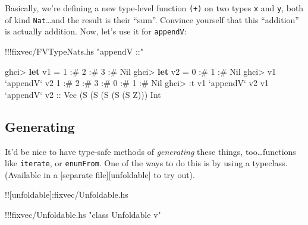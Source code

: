 \documentclass[]{article}
\newenvironment{Shaded}{}{}
\newcommand{\KeywordTok}[1]{\textcolor[rgb]{0.00,0.44,0.13}{\textbf{{#1}}}}
\newcommand{\DataTypeTok}[1]{\textcolor[rgb]{0.56,0.13,0.00}{{#1}}}
\newcommand{\DecValTok}[1]{\textcolor[rgb]{0.25,0.63,0.44}{{#1}}}
\newcommand{\StringTok}[1]{\textcolor[rgb]{0.25,0.44,0.63}{{#1}}}
\newcommand{\OtherTok}[1]{\textcolor[rgb]{0.00,0.44,0.13}{{#1}}}
\newcommand{\FunctionTok}[1]{\textcolor[rgb]{0.02,0.16,0.49}{{#1}}}
\newcommand{\NormalTok}[1]{{#1}}
\begin{document}
Basically, we're defining a new type-level function \texttt{(+)} on two
types \texttt{x} and \texttt{y}, both of kind \texttt{Nat}\ldots{}and
the result is their ``sum''. Convince yourself that this ``addition'' is
actually addition. Now, let's use it for \texttt{appendV}:

\begin{Shaded}
\begin{Highlighting}[]
\FunctionTok{!!!}\NormalTok{fixvec}\FunctionTok{/}\NormalTok{FVTypeNats.hs }\StringTok{"appendV ::"}
\end{Highlighting}
\end{Shaded}

\begin{Shaded}
\begin{Highlighting}[]
\NormalTok{ghci}\FunctionTok{>} \KeywordTok{let} \NormalTok{v1 }\FunctionTok{=} \DecValTok{1} \FunctionTok{:#} \DecValTok{2} \FunctionTok{:#} \DecValTok{3} \FunctionTok{:#} \DataTypeTok{Nil}
\NormalTok{ghci}\FunctionTok{>} \KeywordTok{let} \NormalTok{v2 }\FunctionTok{=} \DecValTok{0} \FunctionTok{:#} \DecValTok{1} \FunctionTok{:#} \DataTypeTok{Nil}
\NormalTok{ghci}\FunctionTok{>} \NormalTok{v1 }\OtherTok{`appendV`} \NormalTok{v2}
\DecValTok{1} \FunctionTok{:#} \DecValTok{2} \FunctionTok{:#} \DecValTok{3} \FunctionTok{:#} \DecValTok{0} \FunctionTok{:#} \DecValTok{1} \FunctionTok{:#} \DataTypeTok{Nil}
\NormalTok{ghci}\FunctionTok{>} \FunctionTok{:}\NormalTok{t v1 }\OtherTok{`appendV`} \NormalTok{v2}
\NormalTok{v1 }\OtherTok{`appendV` v2 ::} \DataTypeTok{Vec} \NormalTok{(}\DataTypeTok{S} \NormalTok{(}\DataTypeTok{S} \NormalTok{(}\DataTypeTok{S} \NormalTok{(}\DataTypeTok{S} \NormalTok{(}\DataTypeTok{S} \DataTypeTok{Z}\NormalTok{))) }\DataTypeTok{Int}
\end{Highlighting}
\end{Shaded}

\subsection{Generating}\label{generating}

It'd be nice to have type-safe methods of \emph{generating} these
things, too\ldots{}functions like \texttt{iterate}, or
\texttt{enumFrom}. One of the ways to do this is by using a typeclass.
(Available in a {[}separate file{]}{[}unfoldable{]} to try out).

!!{[}unfoldable{]}:fixvec/Unfoldable.hs

\begin{Shaded}
\begin{Highlighting}[]
\FunctionTok{!!!}\NormalTok{fixvec}\FunctionTok{/}\NormalTok{Unfoldable.hs }\StringTok{"class Unfoldable v"}
\end{Highlighting}
\end{Shaded}
\end{document}

